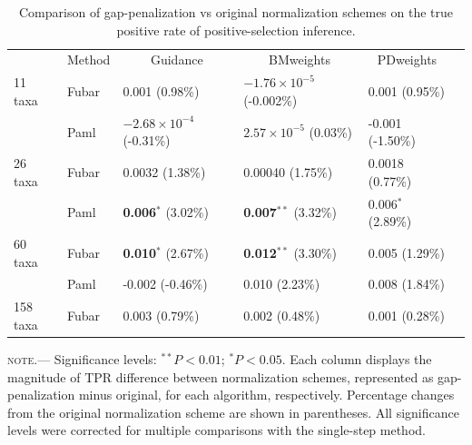 \documentclass[10pt]{article}
\begin{document}
\begin{table}[H]
\caption {\label{tab:penalmodel} Comparison of gap-penalization vs original normalization schemes on the true positive rate of positive-selection inference.}
\begin{tabular}{l l l l l l}
\hline\noalign{\smallskip}
\multicolumn{1}{c}{Simulation Set} & \multicolumn{1}{c}{Method} & \multicolumn{1}{c}{Guidance} & \multicolumn{1}{c}{BMweights} & \multicolumn{1}{c}{PDweights} \\
\noalign{\smallskip}\hline\noalign{\smallskip}
11 taxa  & Fubar & 0.001 (0.98\%) & $-1.76\times10^{-5}$ (-0.002\%) & 0.001 (0.95\%)\\
              & Paml & $-2.68\times10^{-4}$ (-0.31\%) & $2.57\times10^{-5}$ (0.03\%) & -0.001 (-1.50\%)\\
\hline
26 taxa   & Fubar & 0.0032 (1.38\%) & 0.00040 (1.75\%) & 0.0018 (0.77\%)\\
              & Paml & \textbf{0.006}$^{\ast}$ (3.02\%) & \textbf{0.007}$^{\ast\ast}$ (3.32\%) & 0.006$^{\ast}$ (2.89\%) \\
\hline
60 taxa  & Fubar & \textbf{0.010}$^{\ast}$ (2.67\%) & \textbf{0.012}$^{\ast\ast}$ (3.30\%)  & 0.005  (1.29\%)\\
              & Paml & -0.002 (-0.46\%) & 0.010 (2.23\%) & 0.008 (1.84\%) \\
\hline
158 taxa & Fubar & 0.003 (0.79\%) & 0.002 (0.48\%) & 0.001 (0.28\%)\\
\hline
\end{tabular}
\newline
\textsc{note.}--- Significance levels: $^{\ast\ast} P < 0.01$; $^{\ast} P < 0.05$. Each column displays the magnitude of TPR difference between normalization schemes, represented as gap-penalization minus original, for each algorithm, respectively. Percentage changes from the original normalization scheme are shown in parentheses. All significance levels were corrected for multiple comparisons with the single-step method.
\end{table}
\end{document}
